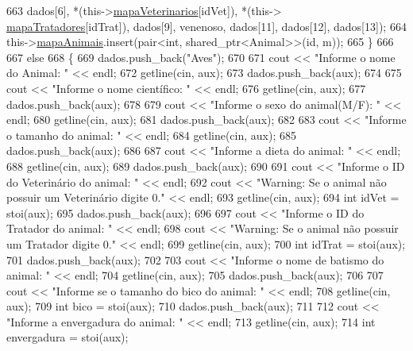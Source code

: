 \begin{DoxyCode}
663                     dados[6], *(this->\hyperlink{classPetFera_a2bed2112a627bbdb3c0338654330a1ab}{mapaVeterinarios}[idVet]), *(this->
      \hyperlink{classPetFera_ac85920fc6c1471743838e6fe4444304d}{mapaTratadores}[idTrat]), dados[9], venenoso, dados[11], dados[12], dados[13]);
664         this->\hyperlink{classPetFera_ab0ba5fe6332bcffdabb7b03001280697}{mapaAnimais}.insert(pair<\textcolor{keywordtype}{int}, shared\_ptr<Animal>>(\textcolor{keywordtype}{id}, m));
665     \}
666 
667     \textcolor{keywordflow}{else}
668     \{
669         dados.push\_back(\textcolor{stringliteral}{"Aves"});
670 
671         cout << \textcolor{stringliteral}{"Informe o nome do Animal: "} << endl;
672         getline(cin, aux);
673         dados.push\_back(aux);
674 
675         cout << \textcolor{stringliteral}{"Informe o nome científico:  "} << endl;
676         getline(cin, aux);
677         dados.push\_back(aux);
678 
679         cout << \textcolor{stringliteral}{"Informe o sexo do animal(M/F): "} << endl;
680         getline(cin, aux);
681         dados.push\_back(aux);
682 
683         cout << \textcolor{stringliteral}{"Informe o tamanho do animal: "} << endl;
684         getline(cin, aux);
685         dados.push\_back(aux);
686 
687         cout << \textcolor{stringliteral}{"Informe a dieta do animal: "} << endl;
688         getline(cin, aux);
689         dados.push\_back(aux);
690 
691         cout << \textcolor{stringliteral}{"Informe o ID do Veterinário do animal: "} << endl;
692         cout << \textcolor{stringliteral}{"Warning: Se o animal não possuir um Veterinário digite 0."} << endl;
693         getline(cin, aux);
694         \textcolor{keywordtype}{int} idVet = stoi(aux);
695         dados.push\_back(aux);
696 
697         cout << \textcolor{stringliteral}{"Informe o ID do Tratador do animal: "} << endl;
698         cout << \textcolor{stringliteral}{"Warning: Se o animal não possuir um Tratador digite 0."} << endl;
699         getline(cin, aux);
700         \textcolor{keywordtype}{int} idTrat = stoi(aux);
701         dados.push\_back(aux);
702 
703         cout << \textcolor{stringliteral}{"Informe o nome de batismo do animal: "} << endl;
704         getline(cin, aux);
705         dados.push\_back(aux);
706 
707         cout << \textcolor{stringliteral}{"Informe se o tamanho do bico do animal: "} << endl;
708         getline(cin, aux);
709         \textcolor{keywordtype}{int} bico = stoi(aux);
710         dados.push\_back(aux);
711 
712         cout << \textcolor{stringliteral}{"Informe a envergadura do animal: "} << endl;
713         getline(cin, aux);
714         \textcolor{keywordtype}{int} envergadura = stoi(aux);

\end{DoxyCode}
